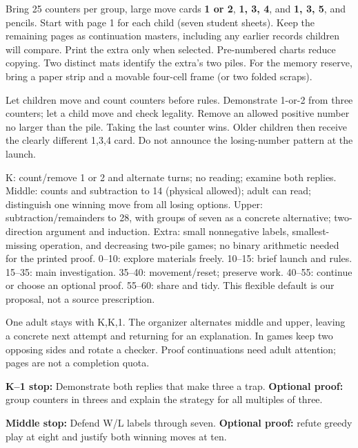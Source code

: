 \documentclass[11pt]{article}
\begin{document}
Bring 25 counters per group, large move cards \textbf{1 or 2}, \textbf{1, 3, 4}, and \textbf{1, 3, 5}, and pencils. Start with page 1 for each child (seven student sheets). Keep the remaining pages as continuation masters, including any earlier records children will compare. Print the extra only when selected. Pre-numbered charts reduce copying. Two distinct mats identify the extra's two piles. For the memory reserve, bring a paper strip and a movable four-cell frame (or two folded scraps).

Let children move and count counters before rules. Demonstrate 1-or-2 from three counters; let a child move and check legality. Remove an allowed positive number no larger than the pile. Taking the last counter wins. Older children then receive the clearly different 1,3,4 card. Do not announce the losing-number pattern at the launch.

K: count/remove 1 or 2 and alternate turns; no reading; examine both replies. Middle: counts and subtraction to 14 (physical allowed); adult can read; distinguish one winning move from all losing options. Upper: subtraction/remainders to 28, with groups of seven as a concrete alternative; two-direction argument and induction. Extra: small nonnegative labels, smallest-missing operation, and decreasing two-pile games; no binary arithmetic needed for the printed proof.
0--10: explore materials freely. 10--15: brief launch and rules. 15--35: main investigation. 35--40: movement/reset; preserve work. 40--55: continue or choose an optional proof. 55--60: share and tidy. This flexible default is our proposal, not a source prescription.

One adult stays with K,K,1. The organizer alternates middle and upper, leaving a concrete next attempt and returning for an explanation. In games keep two opposing sides and rotate a checker. Proof continuations need adult attention; pages are not a completion quota.

\textbf{K--1 stop:} Demonstrate both replies that make three a trap. \textbf{Optional proof:} group counters in threes and explain the strategy for all multiples of three.

\textbf{Middle stop:} Defend W/L labels through seven. \textbf{Optional proof:} refute greedy play at eight and justify both winning moves at ten.
\end{document}
